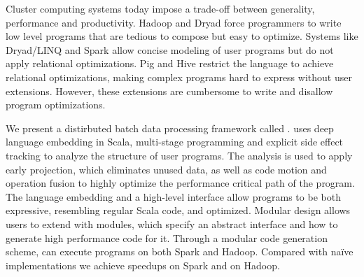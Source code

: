 Cluster computing systems today impose a trade-off between generality,
performance and productivity. Hadoop and Dryad force programmers to write low
level programs that are tedious to compose but easy to optimize. Systems like
Dryad/LINQ and Spark allow concise modeling of user programs but do not apply
relational optimizations. Pig and Hive restrict the language to achieve
relational optimizations, making complex programs hard to express without user
extensions. However, these extensions are cumbersome to write and disallow
program optimizations.

We present a distirbuted batch data processing framework called \tool.
\tool uses deep language embedding in Scala, multi-stage programming and explicit side effect
tracking to analyze the structure of user programs. The analysis is used to
apply early projection, which eliminates unused data, as well as code
motion and operation fusion to highly optimize the performance critical path of
the program. The language embedding and a high-level interface allow \tool
programs to be both expressive, resembling regular Scala code, and optimized.
Modular design allows users to extend \tool with modules, which specify an
abstract interface and how to generate high performance code for it. Through a
modular code generation scheme, \tool can execute programs on both Spark and
Hadoop. Compared with naïve implementations we achieve  speedups on
Spark and  on Hadoop.
